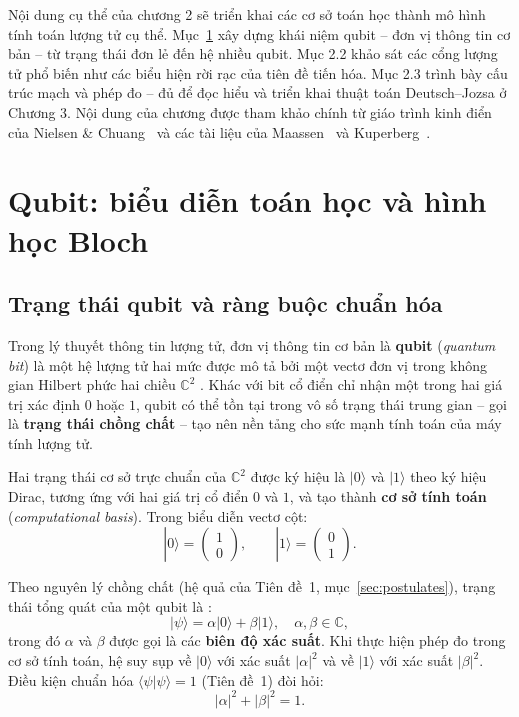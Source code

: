 \label{chap:circuit}

Nội dung cụ thể của chương 2
sẽ triển khai các cơ sở toán học thành mô hình tính toán lượng tử cụ thể. Mục~\ref{sec:qubit}
xây dựng khái niệm qubit -- đơn vị thông tin cơ bản -- từ trạng thái đơn lẻ đến hệ
nhiều qubit. Mục 2.2 khảo sát các cổng lượng tử phổ biến như các biểu
hiện rời rạc của tiên đề tiến hóa. Mục 2.3 trình bày cấu trúc
mạch và phép đo -- đủ để đọc hiểu và triển khai thuật toán Deutsch--Jozsa ở
Chương 3. Nội dung của chương được tham khảo chính từ giáo trình kinh điển của Nielsen \& Chuang~\cite{ref5} và các tài liệu của Maassen~\cite{ref4} và Kuperberg~\cite{ref3}.

\section{Qubit: biểu diễn toán học và hình học Bloch}
\label{sec:qubit}

\subsection*{Trạng thái qubit và ràng buộc chuẩn hóa}

Trong lý thuyết thông tin lượng tử, đơn vị thông tin cơ bản là \textbf{qubit}
(\textit{quantum bit}) là một hệ lượng tử hai mức được mô tả bởi một vectơ đơn
vị trong không gian Hilbert phức hai chiều $\mathbb{C}^2$ \cite{ref5}. Khác với
bit cổ điển chỉ nhận một trong hai giá trị xác định $0$ hoặc $1$, qubit có thể
tồn tại trong vô số trạng thái trung gian -- gọi là \textbf{trạng thái chồng chất}
-- tạo nên nền tảng cho sức mạnh tính toán của máy tính lượng tử.

Hai trạng thái cơ sở trực chuẩn của $\mathbb{C}^2$ được ký hiệu là $|0\rangle$
và $|1\rangle$ theo ký hiệu Dirac, tương ứng với hai
giá trị cổ điển $0$ và $1$, và tạo thành \textbf{cơ sở tính toán}
(\textit{computational basis}). Trong biểu diễn vectơ cột:
$$|0\rangle = \begin{pmatrix}1\\0\end{pmatrix}, \qquad
  |1\rangle = \begin{pmatrix}0\\1\end{pmatrix}.$$

Theo nguyên lý chồng chất (hệ quả của Tiên đề~1, mục~\ref{sec:postulates}),
trạng thái tổng quát của một qubit là \cite{ref5}:
\begin{equation}
    |\psi\rangle = \alpha|0\rangle + \beta|1\rangle,
    \quad \alpha,\beta \in \mathbb{C},
    \label{eq:qubit}
\end{equation}
trong đó $\alpha$ và $\beta$ được gọi là các \textbf{biên độ xác suất}. Khi thực
hiện phép đo trong cơ sở tính toán, hệ suy sụp về $|0\rangle$ với xác suất
$|\alpha|^2$ và về $|1\rangle$ với xác suất $|\beta|^2$. Điều kiện chuẩn hóa
$\langle\psi|\psi\rangle = 1$ (Tiên đề~1) đòi hỏi:
\begin{equation}
    |\alpha|^2 + |\beta|^2 = 1.
    \label{eq:normalization}
\end{equation}

